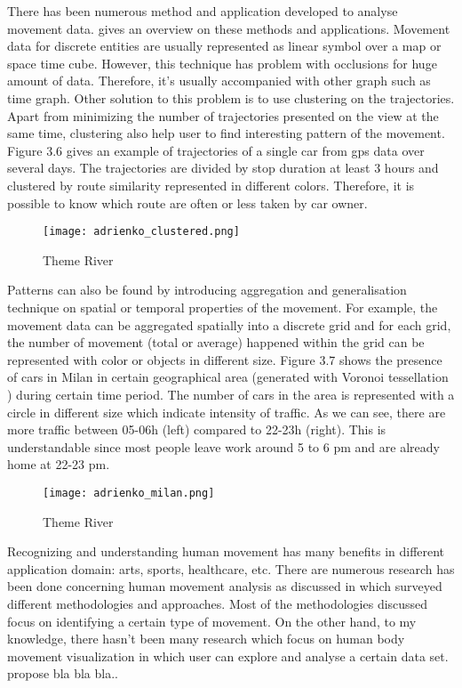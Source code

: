 There has been numerous method and application developed to analyse movement data. \cite{adrienko} gives an overview on these methods and applications. Movement data for discrete entities are usually represented as linear symbol over a map or space time cube. However, this technique has problem with occlusions for huge amount of data. Therefore, it's usually accompanied with other graph such as time graph. Other solution to this problem is to use clustering on the trajectories. Apart from minimizing the number of trajectories presented on the view at the same time, clustering also help user to find interesting pattern of the movement. Figure 3.6 \cite{adrienko_book} gives an example of trajectories of a single car from gps data over several days. The trajectories are divided by stop duration at least 3 hours and clustered by route similarity represented in different colors. Therefore, it is possible to know which route are often or less taken by car owner.

\begin{figure}
\centering
\texttt{[image: adrienko\_clustered.png]}
\caption{Theme River}
\end{figure}

Patterns can also be found by introducing aggregation and generalisation technique on spatial or temporal properties of the movement. For example, the movement data can be aggregated spatially into a discrete grid and for each grid, the number of movement (total or average) happened within the grid can be represented with color or objects in different size. Figure 3.7 \cite{adrienko_book} shows the presence of cars in Milan in certain geographical area (generated with Voronoi tessellation \cite{okabe}) during certain time period. The number of cars in the area is represented with a circle in different size which indicate intensity of traffic. As we can see, there are more traffic between 05-06h (left) compared to 22-23h (right). This is understandable since most people leave work around 5  to 6 pm and are already home at 22-23 pm.

\begin{figure}
\centering
\texttt{[image: adrienko\_milan.png]}
\caption{Theme River}
\end{figure}

Recognizing and understanding human movement has many benefits in different application domain: arts\cite{heryadi,raptis}, sports\cite{bernard2013}, healthcare\cite{patsadu}, etc. There are numerous research has been done concerning human movement analysis as discussed in  \cite{gavrila} which surveyed different methodologies and approaches. Most of the methodologies discussed focus on identifying a certain type of movement. On the other hand, to my knowledge, there hasn't been many research which focus on human body movement visualization in which user can explore and analyse a certain data set. \cite{chmelik} propose bla bla bla..



